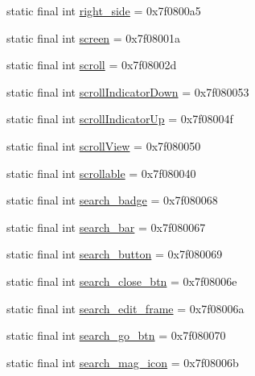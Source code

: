 \begin{CompactItemize}
static final int \hyperlink{classandroid_1_1support_1_1transition_1_1_r_1_1id_e6461b20e7bf573b56e9e4c48bb638bf}{right\_\-side} = 0x7f0800a5
\item 
static final int \hyperlink{classandroid_1_1support_1_1transition_1_1_r_1_1id_123469a02e9e9577fe72250857cb5e31}{screen} = 0x7f08001a
\item 
static final int \hyperlink{classandroid_1_1support_1_1transition_1_1_r_1_1id_f00f2c205b294e1022e793e9d319a3aa}{scroll} = 0x7f08002d
\item 
static final int \hyperlink{classandroid_1_1support_1_1transition_1_1_r_1_1id_491525dbfbda308b4a62165e4f59da68}{scrollIndicatorDown} = 0x7f080053
\item 
static final int \hyperlink{classandroid_1_1support_1_1transition_1_1_r_1_1id_de494c84b13d065f3beff5f5e9193ecf}{scrollIndicatorUp} = 0x7f08004f
\item 
static final int \hyperlink{classandroid_1_1support_1_1transition_1_1_r_1_1id_659c4537d5961eee8a57663bc3aa0731}{scrollView} = 0x7f080050
\item 
static final int \hyperlink{classandroid_1_1support_1_1transition_1_1_r_1_1id_16debf893dc4c4d1675d614fc4a70eef}{scrollable} = 0x7f080040
\item 
static final int \hyperlink{classandroid_1_1support_1_1transition_1_1_r_1_1id_2eb5ac76c0f227085ab44582fabbc3dd}{search\_\-badge} = 0x7f080068
\item 
static final int \hyperlink{classandroid_1_1support_1_1transition_1_1_r_1_1id_9d87b7b30db6917838dd56350997435a}{search\_\-bar} = 0x7f080067
\item 
static final int \hyperlink{classandroid_1_1support_1_1transition_1_1_r_1_1id_26f3cb5a12d4886747174b31b0350e2a}{search\_\-button} = 0x7f080069
\item 
static final int \hyperlink{classandroid_1_1support_1_1transition_1_1_r_1_1id_0da12c6e81f31674b3d687ffa28557ef}{search\_\-close\_\-btn} = 0x7f08006e
\item 
static final int \hyperlink{classandroid_1_1support_1_1transition_1_1_r_1_1id_91431eca672f1af17ed31f10caf5bd2b}{search\_\-edit\_\-frame} = 0x7f08006a
\item 
static final int \hyperlink{classandroid_1_1support_1_1transition_1_1_r_1_1id_145b2a5e93731d2ddfe9a4d90210d27e}{search\_\-go\_\-btn} = 0x7f080070
\item 
static final int \hyperlink{classandroid_1_1support_1_1transition_1_1_r_1_1id_52d2b481e4252b627aa29bf14973c089}{search\_\-mag\_\-icon} = 0x7f08006b
\item 

\end{CompactItemize}
